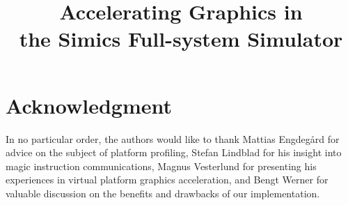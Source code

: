 \documentclass[conference]{IEEEtran}
\begin{document}
\title{%
  Accelerating Graphics in\\
  the Simics Full-system Simulator}

\author{
  \and
  }

\maketitle








%
\IEEEpeerreviewmaketitle

\section*{Acknowledgment}
In no particular order, the authors would like to thank Mattias Engdeg{\aa}rd for advice on the subject of platform profiling, Stefan Lindblad for his insight into magic instruction communications, Magnus Vesterlund for presenting his experiences in virtual platform graphics acceleration, and Bengt Werner for valuable discussion on the benefits and drawbacks of our implementation.



\end{document}
